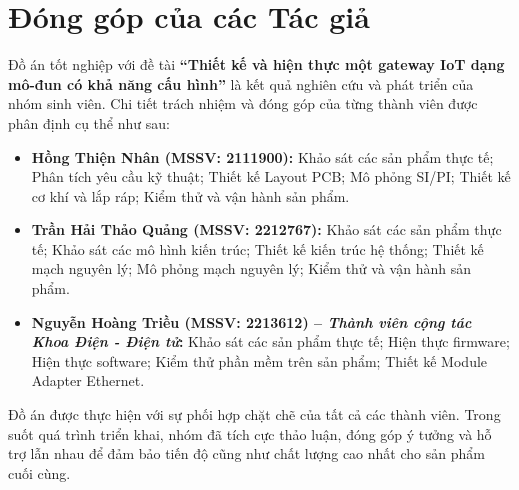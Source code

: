\chapter{Đóng góp của các Tác giả}

Đồ án tốt nghiệp với đề tài \textbf{“Thiết kế và hiện thực một gateway IoT dạng mô-đun có khả năng cấu hình”} là kết quả nghiên cứu và phát triển của nhóm sinh viên. Chi tiết trách nhiệm và đóng góp của từng thành viên được phân định cụ thể như sau:

\begin{itemize}
    \item \textbf{Hồng Thiện Nhân (MSSV: 2111900):} 
    Khảo sát các sản phẩm thực tế; Phân tích yêu cầu kỹ thuật; Thiết kế Layout PCB; Mô phỏng SI/PI; Thiết kế cơ khí và lắp ráp; Kiểm thử và vận hành sản phẩm.
    
    \item \textbf{Trần Hải Thảo Quảng (MSSV: 2212767):} 
    Khảo sát các sản phẩm thực tế; Khảo sát các mô hình kiến trúc; Thiết kế kiến trúc hệ thống; Thiết kế mạch nguyên lý; Mô phỏng mạch nguyên lý; Kiểm thử và vận hành sản phẩm.
    
    \item \textbf{Nguyễn Hoàng Triều (MSSV: 2213612) -- \textit{Thành viên cộng tác Khoa Điện - Điện tử}:}  
    Khảo sát các sản phẩm thực tế; Hiện thực firmware; Hiện thực software; Kiểm thử phần mềm trên sản phẩm; Thiết kế Module Adapter Ethernet.
\end{itemize}

Đồ án được thực hiện với sự phối hợp chặt chẽ của tất cả các thành viên. Trong suốt quá trình triển khai, nhóm đã tích cực thảo luận, đóng góp ý tưởng và hỗ trợ lẫn nhau để đảm bảo tiến độ cũng như chất lượng cao nhất cho sản phẩm cuối cùng.